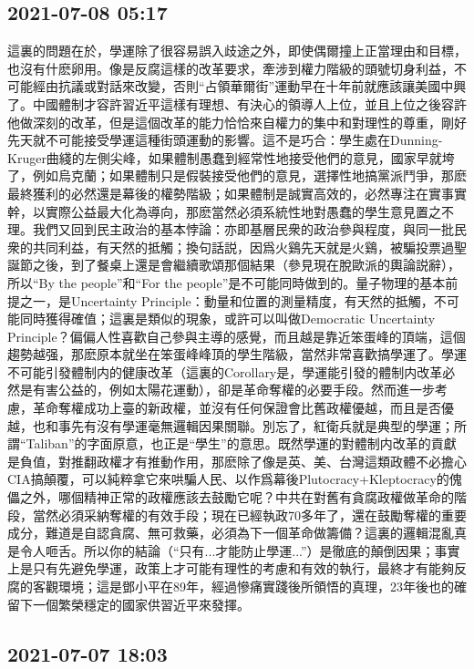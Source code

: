 \documentclass[twocolumn]{ctexart}
\begin{document}
\subsection*{2021-07-08 05:17}
這裏的問題在於，學運除了很容易誤入歧途之外，即使偶爾撞上正當理由和目標，也沒有什麽卵用。像是反腐這樣的改革要求，牽涉到權力階級的頭號切身利益，不可能經由抗議或對話來改變，否則“占領華爾街”運動早在十年前就應該讓美國中興了。中國體制才容許習近平這樣有理想、有決心的領導人上位，並且上位之後容許他做深刻的改革，但是這個改革的能力恰恰來自權力的集中和對理性的尊重，剛好先天就不可能接受學運這種街頭運動的影響。這不是巧合：學生處在Dunning-Kruger曲綫的左側尖峰，如果體制愚蠢到經常性地接受他們的意見，國家早就垮了，例如烏克蘭；如果體制只是假裝接受他們的意見，選擇性地搞黨派鬥爭，那麽最終獲利的必然還是幕後的權勢階級；如果體制是誠實高效的，必然專注在實事實幹，以實際公益最大化為導向，那麽當然必須系統性地對愚蠢的學生意見置之不理。我們又回到民主政治的基本悖論：亦即基層民衆的政治參與程度，與同一批民衆的共同利益，有天然的抵觸；換句話説，因爲火鷄先天就是火鷄，被騙投票過聖誕節之後，到了餐桌上還是會繼續歌頌那個結果（參見現在脫歐派的輿論説辭），所以“By the people”和“For the people”是不可能同時做到的。量子物理的基本前提之一，是Uncertainty Principle：動量和位置的測量精度，有天然的抵觸，不可能同時獲得確值；這裏是類似的現象，或許可以叫做Democratic Uncertainty Principle？偏偏人性喜歡自己參與主導的感覺，而且越是靠近笨蛋峰的頂端，這個趨勢越强，那麽原本就坐在笨蛋峰峰頂的學生階級，當然非常喜歡搞學運了。學運不可能引發體制内的健康改革（這裏的Corollary是，學運能引發的體制内改革必然是有害公益的，例如太陽花運動），卻是革命奪權的必要手段。然而進一步考慮，革命奪權成功上臺的新政權，並沒有任何保證會比舊政權優越，而且是否優越，也和事先有沒有學運毫無邏輯因果關聯。別忘了，紅衛兵就是典型的學運；所謂“Taliban”的字面原意，也正是“學生”的意思。既然學運的對體制内改革的貢獻是負值，對推翻政權才有推動作用，那麽除了像是英、美、台灣這類政體不必擔心CIA搞顛覆，可以純粹拿它來哄騙人民、以作爲幕後Plutocracy+Kleptocracy的傀儡之外，哪個精神正常的政權應該去鼓勵它呢？中共在對舊有貪腐政權做革命的階段，當然必須采納奪權的有效手段；現在已經執政70多年了，還在鼓勵奪權的重要成分，難道是自認貪腐、無可救藥，必須為下一個革命做籌備？這裏的邏輯混亂真是令人咂舌。所以你的結論（“只有...才能防止學運...”）是徹底的顛倒因果；事實上是只有先避免學運，政策上才可能有理性的考慮和有效的執行，最終才有能夠反腐的客觀環境；這是鄧小平在89年，經過慘痛實踐後所領悟的真理，23年後也的確留下一個繁榮穩定的國家供習近平來發揮。\subsection*{2021-07-07 18:03}
\end{document}
